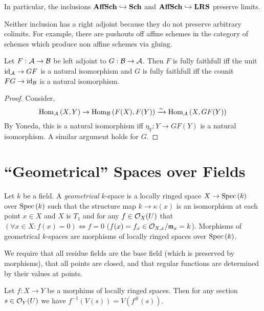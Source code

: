 \documentclass[12pt]{article}
\begin{document}
\begin{rmk}
In particular, the inclusions $\mathbf{AffSch} \hookrightarrow \mathbf{Sch}$ and $\mathbf{AffSch} \hookrightarrow \mathbf{LRS}$ preserve limits. 
\end{rmk}

\begin{rmk}
Neither inclusion has a right adjoint because they do not preserve arbitrary colimits. For example, there are pushouts off affine schemes in the category of schemes which produce non affine schemes via gluing.
\end{rmk}

\begin{lemma}
Let $F : \mathcal{A} \to \mathcal{B}$ be left adjoint to $G : \mathcal{B} \to \mathcal{A}$. Then $F$ is fully faithfull iff the unit $\mathrm{id}_{\mathcal{A}} \to GF$ is a natural isomorphism and $G$ is fully faithfull iff the counit $FG \to \mathrm{id}_{\mathcal{B}}$ is a natural isomorphism.
\end{lemma}

\begin{proof}
Consider,
\[ \mathrm{Hom}_{\mathcal{A}} \left( X, Y \right) \to \mathrm{Hom}_{\mathcal{B}} \left( F(X), F(Y) \right) \xrightarrow{\sim} \mathrm{Hom}_{\mathcal{A}} \left( X, GF(Y) \right) \]
By Yoneda, this is a natural isomorphism iff $\eta_Y : Y \to GF(Y)$ is a natural isomorphism. A similar argument holds for $G$.
\end{proof}

\section{``Geometrical'' Spaces over Fields}

\begin{defn}
Let $k$ be a field. A \textit{geometrical} $k$-space is a locally ringed space $X \to \mathrm{Spec}\left( k \right)$ over $\mathrm{Spec}\left( k \right)$ such that the structure map $k \to \kappa(x)$ is an isomorphism at each point $x \in X$ and $X$ is $T_1$ and for any $f \in \mathcal{O}_{X}(U)$ that $(\forall x \in X : f(x) = 0) \iff f = 0$ ($f(x) = f_x \in \mathcal{O}_{X, x} / \mathfrak{m}_x = k$). Morphisms of geometrical $k$-spaces are morphisms of locally ringed spaces over $\mathrm{Spec}\left( k \right)$.
\end{defn}

\begin{rmk}
We require that all residue fields are the base field (which is preserved by morphisms), that all points are closed, and that regular functions are determined by their values at points.
\end{rmk}

\begin{lemma}
Let $f : X \to Y$ be a morphims of locally ringed spaces. Then for any section $s \in \mathcal{O}_{Y}(U)$ we have $f^{-1}(V(s)) = V(f^\#(s))$.
\end{lemma}
\end{document}
